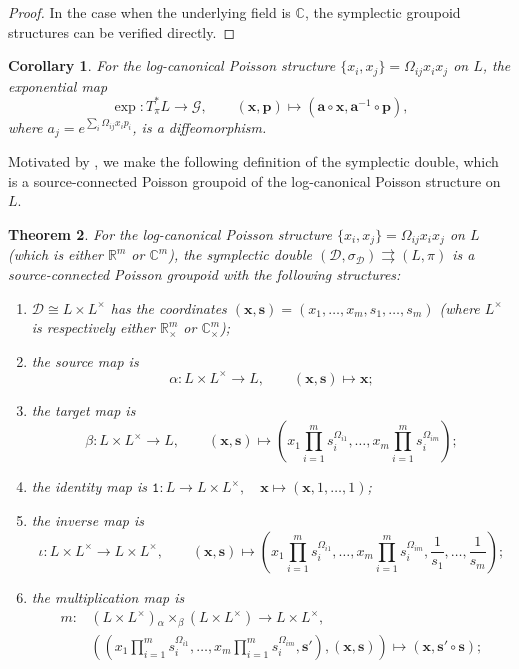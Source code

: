 \documentclass{amsart}
\newtheorem{theorem}{Theorem}[section]
\newtheorem{corollary}[theorem]{Corollary}
\numberwithin{equation}{section}
\newcommand{\bfa}{{\boldsymbol{a}}}
\newcommand{\bfp}{{\boldsymbol{p}}}
\newcommand{\bfs}{{\boldsymbol{s}}}
\newcommand{\bfx}{{\boldsymbol{x}}}
\newcommand{\cD}{\mathcal{D}}
\newcommand{\cG}{\mathcal{G}}
\newcommand{\CC}{\mathbb{C}}
\newcommand{\RR}{\mathbb{R}}
\newcommand{\rra}{\rightrightarrows}
\begin{document}
\begin{proof}
  In the case when the underlying field is $\CC$, the symplectic groupoid structures can be verified directly.
\end{proof}

\begin{corollary} \label{cor:exp}
  For the log-canonical Poisson structure $\{x_i, x_j\} = \Omega_{ij} x_i x_j$ on $L$, the exponential map
  \[\exp: T^*_\pi L \to \cG, \qquad (\bfx, \bfp) \mapsto \left(\bfa \circ \bfx, \bfa^{-1} \circ \bfp\right),\]
  where $a_j = e^{\sum_i \Omega_{ij} x_ip_i}$, is a diffeomorphism.
\end{corollary}

Motivated by \cite{FG09c}, we make the following definition of the symplectic double, which is a source-connected Poisson groupoid of the log-canonical Poisson structure on $L$.
\begin{theorem} \label{thm:SymDBLoc}
  \cite{FG09c}
  For the log-canonical Poisson structure $\{x_i, x_j\} = \Omega_{ij} x_i x_j$ on $L$ (which is either $\RR^m$ or $\CC^m$), the \emph{symplectic double} $(\cD, \sigma_\cD) \rra (L, \pi)$ is a source-connected Poisson groupoid with the following structures:
  \begin{enumerate}
    \item $\cD \cong L \times L^\times$ has the coordinates $(\bfx, \bfs) = (x_1, \ldots, x_m, s_1, \ldots, s_m)$ (where $L^\times$ is respectively either $\RR_\times^m$ or $\CC_\times^m$);
    \item the source map is
      \[\alpha: L \times L^\times \to L, \qquad (\bfx, \bfs) \mapsto \bfx;\]
    \item the target map is
      \[\beta: L \times L^\times \to L, \qquad (\bfx, \bfs) \mapsto \left(x_1 \prod_{i=1}^m s_i^{\Omega_{i1}}, \ldots, x_m \prod_{i=1}^m s_i^{\Omega_{im}}\right);\]
    \item the identity map is $\mathtt{1}: L \to L \times L^\times, \quad \bfx \mapsto (\bfx, 1, \ldots, 1)$;
    \item the inverse map is
      \[\iota: L \times L^\times \to L \times L^\times, \qquad (\bfx,\bfs) \mapsto \left(x_1\prod_{i=1}^m s_i^{\Omega_{i1}}, \ldots, x_m\prod_{i=1}^m s_i^{\Omega_{im}}, \frac{1}{s_1}, \ldots, \frac{1}{s_m}\right);\]
    \item the multiplication map is
      \[\begin{aligned}
	  m: & \left(L \times L^\times\right) {_\alpha \times_\beta} \left(L \times L^\times\right) \to L \times L^\times, \\
	     & \left(\left(x_1 \prod_{i=1}^m s_i^{\Omega_{i1}}, \ldots, x_m \prod_{i=1}^m s_i^{\Omega_{im}}, \bfs'\right), (\bfx, \bfs)\right) \mapsto (\bfx, \bfs' \circ \bfs);

\end{aligned}\]
\end{enumerate}
\end{theorem}
\end{document}
